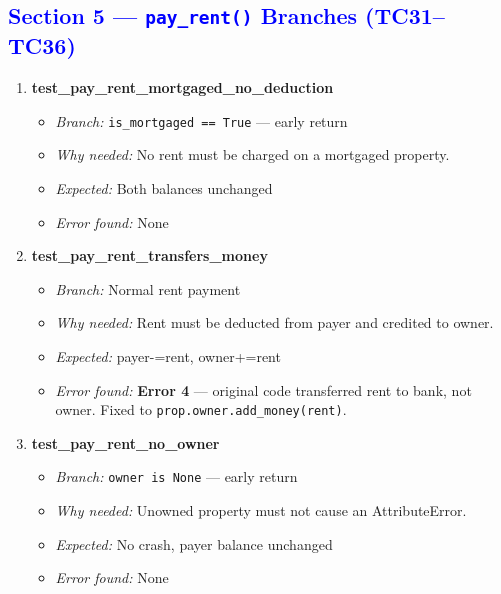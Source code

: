 \documentclass{article}
\begin{document}
\subsection*{\textcolor{blue}{Section 5 — \texttt{pay\_rent()} Branches (TC31–TC36)}}

\begin{enumerate}[resume, label=\textbf{TC\arabic*.}]

  \item \textbf{test\_pay\_rent\_mortgaged\_no\_deduction}
  \begin{itemize}[noitemsep]
    \item \textit{Branch:} \texttt{is\_mortgaged == True} — early return
    \item \textit{Why needed:} No rent must be charged on a mortgaged property.
    \item \textit{Expected:} Both balances unchanged
    \item \textit{Error found:} None
  \end{itemize}

  \item \textbf{test\_pay\_rent\_transfers\_money}
  \begin{itemize}[noitemsep]
    \item \textit{Branch:} Normal rent payment
    \item \textit{Why needed:} Rent must be deducted from payer and credited to owner.
    \item \textit{Expected:} payer-=rent, owner+=rent
    \item \textit{Error found:} \textbf{Error 4} — original code transferred rent to bank, not owner. Fixed to \texttt{prop.owner.add\_money(rent)}.
  \end{itemize}

  \item \textbf{test\_pay\_rent\_no\_owner}
  \begin{itemize}[noitemsep]
    \item \textit{Branch:} \texttt{owner is None} — early return
    \item \textit{Why needed:} Unowned property must not cause an AttributeError.
    \item \textit{Expected:} No crash, payer balance unchanged
    \item \textit{Error found:} None
  \end{itemize}


\end{enumerate}
\end{document}
